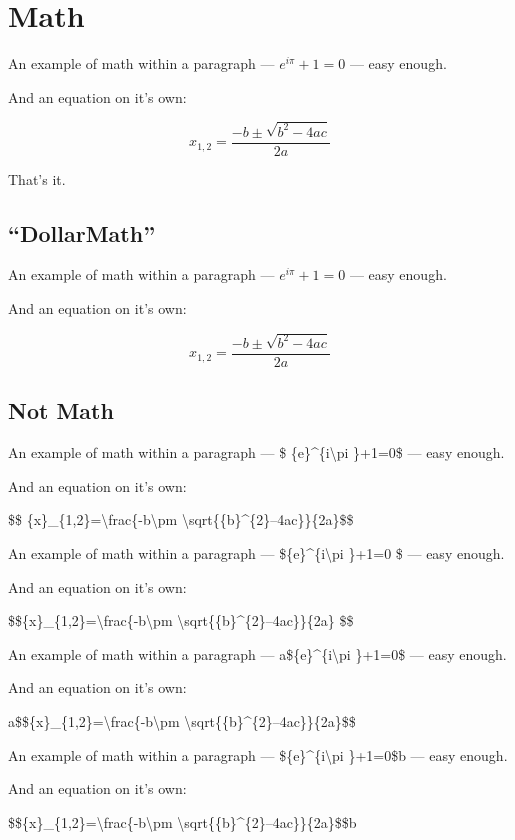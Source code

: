 
\def\mytitle{MultiMarkdown Math Example}


\part{Math}
\label{math}

An example of math within a paragraph --- ${e}^{i\pi }+1=0$ --- easy
enough.

And an equation on it's own:

\[ {x}_{1,2}=\frac{-b\pm \sqrt{{b}^{2}-4ac}}{2a} \]

That's it.

\chapter{``DollarMath''}
\label{dollarmath}

An example of math within a paragraph --- ${e}^{i\pi }+1=0$ --- easy
enough.

And an equation on it's own:

$${x}_{1,2}=\frac{-b\pm \sqrt{{b}^{2}-4ac}}{2a}$$

\chapter{Not Math}
\label{notmath}

An example of math within a paragraph --- \$ \{e\}\^{}\{i\textbackslash{}pi \}+1=0\$ --- easy
enough.

And an equation on it's own:

\$\$ \{x\}\_\{1,2\}=\textbackslash{}frac\{-b\textbackslash{}pm \textbackslash{}sqrt\{\{b\}\^{}\{2\}--4ac\}\}\{2a\}\$\$

An example of math within a paragraph --- \$\{e\}\^{}\{i\textbackslash{}pi \}+1=0 \$ --- easy
enough.

And an equation on it's own:

\$\$\{x\}\_\{1,2\}=\textbackslash{}frac\{-b\textbackslash{}pm \textbackslash{}sqrt\{\{b\}\^{}\{2\}--4ac\}\}\{2a\} \$\$

An example of math within a paragraph --- a\$\{e\}\^{}\{i\textbackslash{}pi \}+1=0\$ --- easy
enough.

And an equation on it's own:

a\$\$\{x\}\_\{1,2\}=\textbackslash{}frac\{-b\textbackslash{}pm \textbackslash{}sqrt\{\{b\}\^{}\{2\}--4ac\}\}\{2a\}\$\$

An example of math within a paragraph --- \$\{e\}\^{}\{i\textbackslash{}pi \}+1=0\$b --- easy
enough.

And an equation on it's own:

\$\$\{x\}\_\{1,2\}=\textbackslash{}frac\{-b\textbackslash{}pm \textbackslash{}sqrt\{\{b\}\^{}\{2\}--4ac\}\}\{2a\}\$\$b




